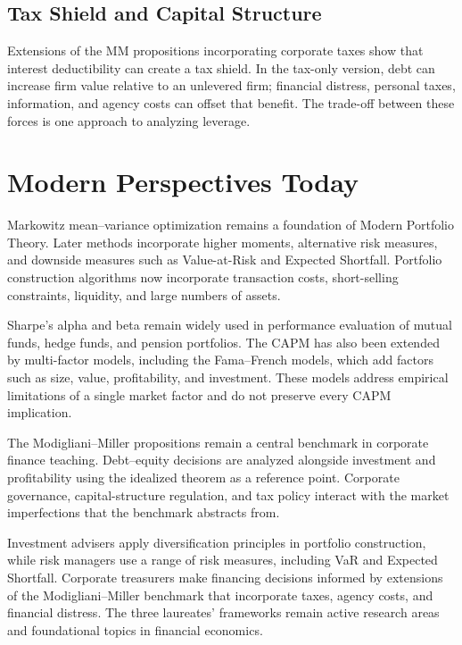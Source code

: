 \subsection*{Tax Shield and Capital Structure}
Extensions of the MM propositions incorporating corporate taxes show that
interest deductibility can create a tax shield. In the tax-only version, debt
can increase firm value relative to an unlevered firm; financial distress,
personal taxes, information, and agency costs can offset that benefit. The
trade-off between these forces is one approach to analyzing leverage.

\section{Modern Perspectives Today}
Markowitz mean--variance optimization remains a foundation of Modern Portfolio
Theory. Later methods incorporate higher moments, alternative risk measures,
and downside measures such as Value-at-Risk and Expected Shortfall. Portfolio
construction algorithms now incorporate transaction costs, short-selling
constraints, liquidity, and large numbers of assets.

Sharpe's alpha and beta remain widely used in performance evaluation of mutual
funds, hedge funds, and pension portfolios. The CAPM has also been extended by
multi-factor models, including the Fama--French models, which add factors such
as size, value, profitability, and investment. These models address empirical
limitations of a single market factor and do not preserve every CAPM
implication.

The Modigliani--Miller propositions remain a central benchmark in corporate
finance teaching. Debt--equity decisions are analyzed alongside investment and
profitability using the idealized theorem as a reference point. Corporate
governance, capital-structure regulation, and tax policy interact with the
market imperfections that the benchmark abstracts from.

Investment advisers apply diversification principles in portfolio construction,
while risk managers use a range of risk measures, including VaR and Expected
Shortfall. Corporate treasurers make financing decisions informed by
extensions of the Modigliani--Miller benchmark that incorporate taxes, agency
costs, and financial distress. The three laureates' frameworks remain active
research areas and foundational topics in financial economics.

